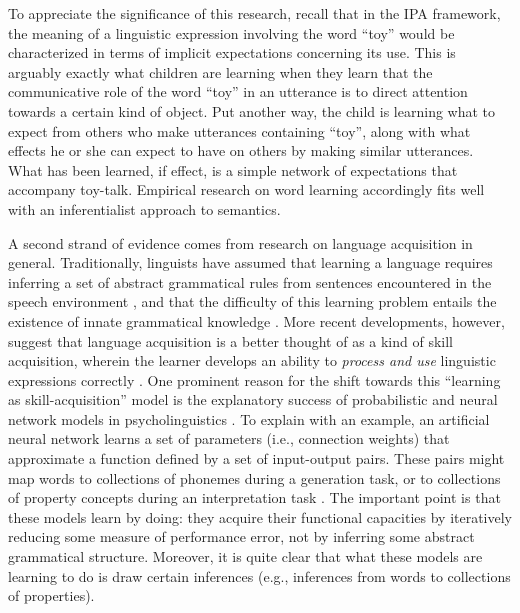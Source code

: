 To appreciate the significance of this research, recall that in the IPA framework, the meaning of a linguistic expression involving the word ``toy'' would be characterized in terms of implicit expectations concerning its use. This is arguably exactly what children are learning when they learn that the communicative role of the word ``toy'' in an utterance is to direct attention towards a certain kind of object. Put another way, the child is learning what to expect from others who make utterances containing ``toy'', along with what effects he or she can expect to have on others by making similar utterances. What has been learned, if effect, is a simple network of expectations that accompany toy-talk. Empirical research on word learning accordingly fits well with an inferentialist approach to semantics. 

A second strand of evidence comes from research on language acquisition in general. Traditionally, linguists have assumed that learning a language requires inferring a set of abstract grammatical rules from sentences encountered in the speech environment \citep{Harley:2014,Pinker:1994,Seidenberg:1997}, and that the difficulty of this learning problem entails the existence of innate grammatical knowledge \citep{Harley:2014,Seidenberg:1997,Chomsky:1990}. More recent developments, however, suggest that language acquisition is a better thought of as a kind of skill acquisition, wherein the learner develops an ability to \textit{process and use} linguistic expressions correctly \citep{Christiansen:2015,Seidenberg:1997}. One prominent reason for the shift towards this ``learning as skill-acquisition'' model is the explanatory success of probabilistic and neural network models in psycholinguistics \citep{Seidenberg:1997}. To explain with an example, an artificial neural network learns a set of parameters (i.e., connection weights) that approximate a function defined by a set of input-output pairs. These pairs might map words to collections of phonemes during a generation task, or to collections of property concepts during an interpretation task \citep[see, e.g.,][]{McClelland:2010}. The important point is that these models learn by doing: they acquire their functional capacities by iteratively reducing some measure of performance error, not by inferring some abstract grammatical structure. Moreover, it is quite clear that what these models are learning to do is draw certain inferences (e.g., inferences from words to collections of properties). 

